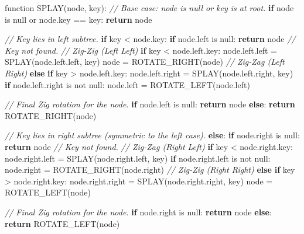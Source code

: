 \documentclass[
]{article}
\newenvironment{Shaded}{}{}
\newcommand{\CommentTok}[1]{\textcolor[rgb]{0.38,0.63,0.69}{\textit{#1}}}
\newcommand{\ControlFlowTok}[1]{\textcolor[rgb]{0.00,0.44,0.13}{\textbf{#1}}}
\newcommand{\NormalTok}[1]{#1}
\begin{document}
\begin{pcode}

\begin{Shaded}
\begin{Highlighting}[]
\NormalTok{function SPLAY(node, key):}
  \CommentTok{// Base case: node is null or key is at root.}
  \ControlFlowTok{if}\NormalTok{ node is null or node.key == key:}
    \ControlFlowTok{return}\NormalTok{ node}

  \CommentTok{// Key lies in left subtree.}
  \ControlFlowTok{if}\NormalTok{ key \textless{} node.key:}
    \ControlFlowTok{if}\NormalTok{ node.left is null: }\ControlFlowTok{return}\NormalTok{ node }\CommentTok{// Key not found.}
    \CommentTok{// Zig{-}Zig (Left Left)}
    \ControlFlowTok{if}\NormalTok{ key \textless{} node.left.key:}
\NormalTok{      node.left.left = SPLAY(node.left.left, key)}
\NormalTok{      node = ROTATE\_RIGHT(node)}
    \CommentTok{// Zig{-}Zag (Left Right)}
    \ControlFlowTok{else} \ControlFlowTok{if}\NormalTok{ key \textgreater{} node.left.key:}
\NormalTok{      node.left.right = SPLAY(node.left.right, key)}
      \ControlFlowTok{if}\NormalTok{ node.left.right is not null:}
\NormalTok{        node.left = ROTATE\_LEFT(node.left)}
    
    \CommentTok{// Final Zig rotation for the node.}
    \ControlFlowTok{if}\NormalTok{ node.left is null: }\ControlFlowTok{return}\NormalTok{ node}
    \ControlFlowTok{else}\NormalTok{: }\ControlFlowTok{return}\NormalTok{ ROTATE\_RIGHT(node)}
  
  \CommentTok{// Key lies in right subtree (symmetric to the left case).}
  \ControlFlowTok{else}\NormalTok{:}
    \ControlFlowTok{if}\NormalTok{ node.right is null: }\ControlFlowTok{return}\NormalTok{ node }\CommentTok{// Key not found.}
    \CommentTok{// Zig{-}Zag (Right Left)}
    \ControlFlowTok{if}\NormalTok{ key \textless{} node.right.key:}
\NormalTok{      node.right.left = SPLAY(node.right.left, key)}
      \ControlFlowTok{if}\NormalTok{ node.right.left is not null:}
\NormalTok{        node.right = ROTATE\_RIGHT(node.right)}
    \CommentTok{// Zig{-}Zig (Right Right)}
    \ControlFlowTok{else} \ControlFlowTok{if}\NormalTok{ key \textgreater{} node.right.key:}
\NormalTok{      node.right.right = SPLAY(node.right.right, key)}
\NormalTok{      node = ROTATE\_LEFT(node)}

    \CommentTok{// Final Zig rotation for the node.}
    \ControlFlowTok{if}\NormalTok{ node.right is null: }\ControlFlowTok{return}\NormalTok{ node}
    \ControlFlowTok{else}\NormalTok{: }\ControlFlowTok{return}\NormalTok{ ROTATE\_LEFT(node)}
\end{Highlighting}
\end{Shaded}

\end{pcode}
\end{document}
